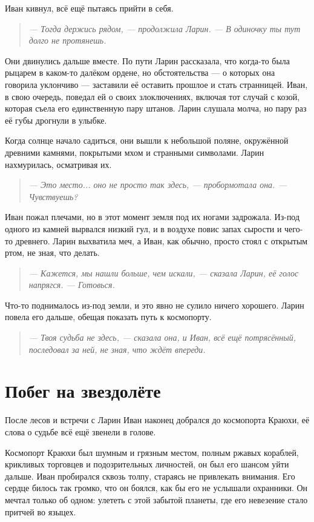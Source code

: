\documentclass[12pt,a4paper]{book} %
\newenvironment{dialogue}{\begin{quote}\itshape}{\end{quote}}
\begin{document}
Иван кивнул, всё ещё пытаясь прийти в себя.

\begin{dialogue}
--- Тогда держись рядом, --- продолжила Ларин. --- В одиночку ты тут долго не протянешь.
\end{dialogue}

Они двинулись дальше вместе. По пути Ларин рассказала, что когда-то была рыцарем в каком-то далёком ордене, но обстоятельства --- о которых она говорила уклончиво --- заставили её оставить прошлое и стать странницей. Иван, в свою очередь, поведал ей о своих злоключениях, включая тот случай с козой, которая съела его единственную пару штанов. Ларин слушала молча, но пару раз её губы дрогнули в улыбке.

Когда солнце начало садиться, они вышли к небольшой поляне, окружённой древними камнями, покрытыми мхом и странными символами. Ларин нахмурилась, осматривая их.

\begin{dialogue}
--- Это место... оно не просто так здесь, --- пробормотала она. --- Чувствуешь?
\end{dialogue}

Иван пожал плечами, но в этот момент земля под их ногами задрожала. Из-под одного из камней вырвался низкий гул, и в воздухе повис запах сырости и чего-то древнего. Ларин выхватила меч, а Иван, как обычно, просто стоял с открытым ртом, не зная, что делать.

\begin{dialogue}
--- Кажется, мы нашли больше, чем искали, --- сказала Ларин, её голос напрягся. --- Готовься.
\end{dialogue}

Что-то поднималось из-под земли, и это явно не сулило ничего хорошего. Ларин повела его дальше, обещая показать путь к космопорту.

\begin{dialogue}
--- Твоя судьба не здесь, --- сказала она, и Иван, всё ещё потрясённый, последовал за ней, не зная, что ждёт впереди.
\end{dialogue}

\chapter{Побег на звездолёте}

После лесов и встречи с Ларин Иван наконец добрался до космопорта Краюхи, её слова о судьбе всё ещё звенели в голове.

Космопорт Краюхи был шумным и грязным местом, полным ржавых кораблей, крикливых торговцев и подозрительных личностей, он был его шансом уйти дальше. Иван пробирался сквозь толпу, стараясь не привлекать внимания. Его сердце билось так громко, что он боялся, как бы его не услышали охранники. Он мечтал только об одном: улететь с этой забытой планеты, где его невезение стало притчей во языцех.
\end{document}
